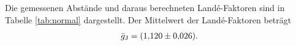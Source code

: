 Die gemessenen Abstände und daraus berechneten Landé-Faktoren sind in Tabelle \ref{tab:normal} dargestellt.
Der Mittelwert der Landé-Faktoren beträgt
\begin{align}
	\bar{g}_\text{J} = \SI{1.12 \pm 0.026}{}.
\end{align}

